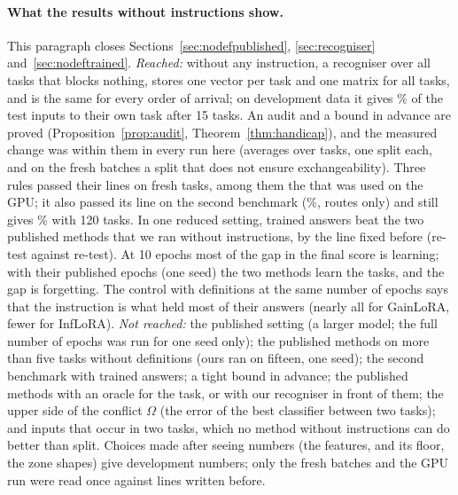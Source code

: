 

\begin{table}[t]
  \caption{The 15 SuperNI tasks without definitions, seed 42, T5-base, 10 epochs, re-test: the same plain adapters under each rule. Columns as in Table~\ref{tab:noinstfull}; the last column is the share of test inputs given to their own task after the last task. The three bottom rows are the run with definitions of Section~\ref{sec:fifteen}, for reference.}
  \label{tab:noinstfifteen}
  \centering
  
\end{table}

\paragraph{What the results without instructions show.} This paragraph closes Sections~\ref{sec:nodefpublished}, \ref{sec:recogniser} and~\ref{sec:nodeftrained}. \emph{Reached:} without any instruction, a recogniser over all tasks that blocks nothing, stores one vector per task and one matrix for all tasks, and is the same for every order of arrival; on development data it gives \AudDevLLamOneEnd{}\% of the test inputs to their own task after 15 tasks. An audit and a bound in advance are proved (Proposition~\ref{prop:audit}, Theorem~\ref{thm:handicap}), and the measured change was within them in every run here (averages over tasks, one split each, and on the fresh batches a split that does not ensure exchangeability). Three rules passed their lines on fresh tasks, among them the \recog{} that was used on the GPU; it also passed its line on the second benchmark (\AudScaleLongThreeEnd{}\%, routes only) and still gives \AudScaleAllHundredTwentyEnd{}\% with 120 tasks. In one reduced setting, trained answers beat the two published methods that we ran without instructions, by the line fixed before (re-test against re-test). At 10 epochs most of the gap in the final score is learning; with their published \AudFullEpochs{} epochs (one seed) the two methods learn the tasks, and the gap is forgetting. The control with definitions at the same number of epochs says that the instruction is what held most of their answers (nearly all for GainLoRA, fewer for InfLoRA).
\emph{Not reached:} the published setting (a larger model; the full number of epochs was run for one seed only); the published methods on more than five tasks without definitions (ours ran on fifteen, one seed); the second benchmark with trained answers; a tight bound in advance; the published methods with an oracle for the task, or with our recogniser in front of them; the upper side of the conflict $\Omega$ (the error of the best classifier between two tasks); and inputs that occur in two tasks, which no method without instructions can do better than split.
Choices made after seeing numbers (the features, \handicap{} and its floor, the zone shapes) give development numbers; only the fresh batches and the GPU run were read once against lines written before.
